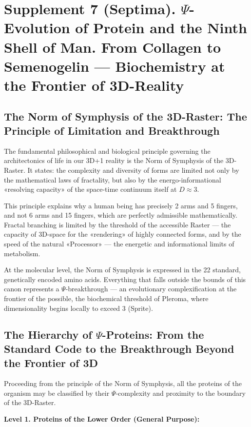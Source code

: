 \documentclass[a4paper,12pt]{article}
\begin{document}
	\newpage
	\section{Supplement 7 (Septima). $\Psi$-Evolution of Protein and the Ninth Shell of Man. From Collagen to Semenogelin — Biochemistry at the Frontier of 3D-Reality}
	
	\subsection{The Norm of Symphysis of the 3D-Raster: The Principle of Limitation and Breakthrough}
	
	The fundamental philosophical and biological principle governing the architectonics of life in our 3D+1 reality is the Norm of Symphysis of the 3D-Raster. It states: the complexity and diversity of forms are limited not only by the mathematical laws of fractality, but also by the energo-informational «resolving capacity» of the space-time continuum itself at $D \approx 3$.
	
	This principle explains why a human being has precisely 2 arms and 5 fingers, and not 6 arms and 15 fingers, which are perfectly admissible mathematically. Fractal branching is limited by the threshold of the accessible Raster — the capacity of 3D-space for the «rendering» of highly connected forms, and by the speed of the natural «Processor» — the energetic and informational limits of metabolism.
	
	At the molecular level, the Norm of Symphysis is expressed in the 22 standard, genetically encoded amino acids. Everything that falls outside the bounds of this canon represents a $\Psi$-breakthrough — an evolutionary complexification at the frontier of the possible, the biochemical threshold of Pleroma, where dimensionality begins locally to exceed 3 (Sprite).
	
	\subsection{The Hierarchy of $\Psi$-Proteins: From the Standard Code to the Breakthrough Beyond the Frontier of 3D}
	
	Proceeding from the principle of the Norm of Symphysis, all the proteins of the organism may be classified by their $\Psi$-complexity and proximity to the boundary of the 3D-Raster.
	
	\textbf{Level 1. Proteins of the Lower Order (General Purpose):}
	
\end{document}
